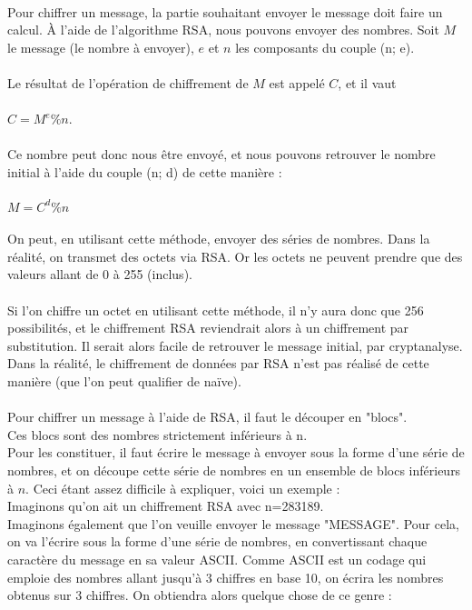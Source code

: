 		\\
		Pour chiffrer un message, la partie souhaitant envoyer le message doit faire un calcul. À l'aide de l'algorithme RSA, nous pouvons envoyer des nombres. Soit $M$ le message (le nombre à envoyer), $e$ et $n$ les composants du couple (n; e).\\
		\\
		Le résultat de l'opération de chiffrement de $M$ est appelé $C$, et il vaut\\
		\\
		$C = M^e \% n$.\\
		\\
		Ce nombre peut donc nous être envoyé, et nous pouvons retrouver le nombre initial à l'aide du couple (n; d) de cette manière :\\
		\\
		$M = C^d \% n$\\
		\\
		On peut, en utilisant cette méthode, envoyer des séries de nombres. Dans la réalité, on transmet des octets via RSA. Or les octets ne peuvent prendre que des valeurs allant de 0 à 255 (inclus).\\
		\\
		Si l'on chiffre un octet en utilisant cette méthode, il n'y aura donc que 256 possibilités, et le chiffrement RSA reviendrait alors à un chiffrement par substitution. Il serait alors facile de retrouver le message initial, par cryptanalyse.\\
		Dans la réalité, le chiffrement de données par RSA n'est pas réalisé de cette manière (que l'on peut qualifier de naïve).\\
		\\
		Pour chiffrer un message à l'aide de RSA, il faut le découper en "blocs".\\
		Ces blocs sont des nombres strictement inférieurs à n.\\
		Pour les constituer, il faut écrire le message à envoyer sous la forme d'une série de nombres, et on découpe cette série de nombres en un ensemble de blocs inférieurs à $n$. Ceci étant assez difficile à expliquer, voici un exemple :\\
		Imaginons qu'on ait un chiffrement RSA avec n=283189.\\
		Imaginons également que l'on veuille envoyer le message "MESSAGE". Pour cela, on va l'écrire sous la forme d'une série de nombres, en convertissant chaque caractère du message en sa valeur ASCII. Comme ASCII est un codage qui emploie des nombres allant jusqu'à 3 chiffres en base 10, on écrira les nombres obtenus sur 3 chiffres. On obtiendra alors quelque chose de ce genre :\\
